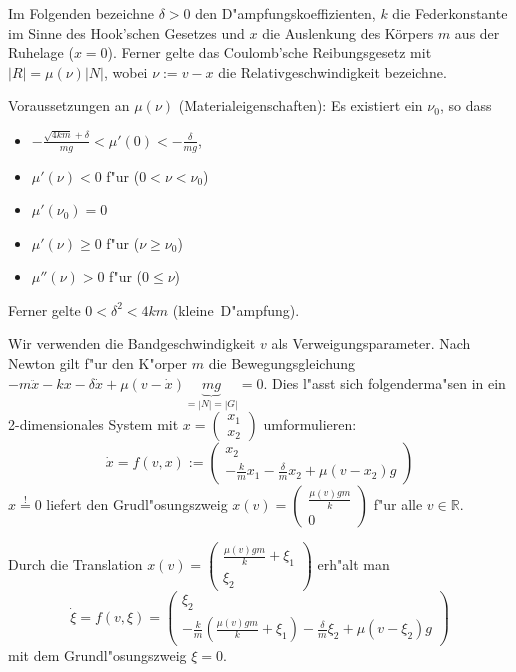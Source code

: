 \documentclass[a4paper, 13pt]{scrreprt}
\theoremstyle{definition} \newtheorem{definition}{Definition}[section]
\newenvironment{beispiel}[1][Beispiel]{\begin{trivlist}
\item[\hskip \labelsep {\bfseries #1}]}{\end{trivlist}}
\newcommand{\RR}{\mathbb{R}}
\begin{document}
\begin{beispiel}[Reibschwinger aus der Mechanik]
Im Folgenden bezeichne $\delta>0$ den D"ampfungskoeffizienten, $k$ die Federkonstante im Sinne des Hook'schen Gesetzes und $x$ die Auslenkung des Körpers $m$ aus der Ruhelage ($x=0$). Ferner gelte das Coulomb'sche Reibungsgesetz mit $|R|=\mu(\nu)|N|$, wobei $\nu:=v-x$ die Relativgeschwindigkeit bezeichne.

Voraussetzungen an $\mu(\nu)$ (Materialeigenschaften): Es existiert ein $\nu_0$, so dass
\begin{itemize}
\item
$-\frac{\sqrt{4km}+\delta}{mg}<\mu'(0)<-\frac{\delta}{mg}$,
\item
$\mu'(\nu)<0$ f"ur ($0<\nu<\nu_0$)
\item
$\mu'(\nu_0)=0$
\item
$\mu'(\nu)\geq0$ f"ur ($\nu\geq\nu_0$)
\item
$\mu''(\nu)>0$ f"ur ($0\leq\nu$)
\end{itemize}

Ferner gelte $0<\delta^2<4km$ (\glqq kleine\grqq\ D"ampfung).

Wir verwenden die Bandgeschwindigkeit $v$ als Verweigungsparameter. Nach Newton gilt f"ur den K"orper $m$ die Bewegungsgleichung $-m\ddot{x}-kx-\delta\dot{x}+\mu(v-\dot{x})\underbrace{mg}_{=|N|=|G|}=0$. Dies l"asst sich folgenderma"sen in ein 2-dimensionales System mit $x=\begin{pmatrix} x_1\\ x_2\end{pmatrix}$ umformulieren:
\[
\dot{x}=f(v,x):=\begin{pmatrix}
x_2\\
-\frac{k}{m}x_1-\frac{\delta}{m}x_2+\mu(v-x_2)g
\end{pmatrix}
\]
$x\stackrel{!}{=}0$ liefert den Grudl"osungszweig $x(v)=\begin{pmatrix}
\frac{\mu(v)gm}{k}\\
0
\end{pmatrix}$ f"ur alle $v\in\RR$.

Durch die Translation $x(v)=\begin{pmatrix}
\frac{\mu(v)gm}{k}+\xi_1\\
\xi_2
\end{pmatrix}$ erh"alt man 
\[
\dot{\xi}=f(v,\xi)=\begin{pmatrix}
\xi_2\\
-\frac{k}{m}(\frac{\mu(v)gm}{k}+\xi_1)-\frac{\delta}{m}\xi_2+\mu(v-\xi_2)g
\end{pmatrix}
\]
mit dem Grundl"osungszweig $\xi=0$.


\end{beispiel}
\end{document}
